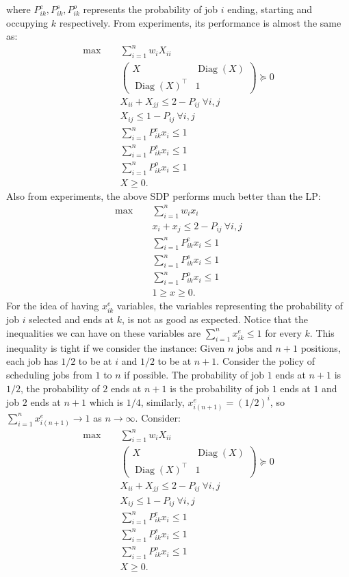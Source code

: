 \documentclass{article}
\newcommand{\Diag}{\operatorname{Diag}}
\begin{document}
where $P_{ik}^e,P_{ik}^s,P_{ik}^o$ represents the probability of job $i$ ending, starting and occupying $k$ respectively.
From experiments, its performance is almost the same as:
\begin{align*}
    \max\quad~&\sum_{i=1}^{n}w_iX_{ii}\\
    &\begin{pmatrix}
        X &\Diag(X)\\
        \Diag(X)^\top &1
    \end{pmatrix}\succeq 0\\
    &X_{ii}+X_{jj}\leq 2-P_{ij}~\forall i,j\\
    &X_{ij}\leq 1-P_{ij}~\forall i,j\\
    & \sum_{i=1}^{n}P_{ik}^e x_i\leq1\\
    & \sum_{i=1}^{n}P_{ik}^s x_i\leq1\\
    & \sum_{i=1}^{n}P_{ik}^o x_i\leq1\\
    &X\geq 0.
\end{align*}
Also from experiments, the above SDP performs much better than the LP:
\begin{align*}
        \max\quad~&\sum_{i=1}^{n}w_ix_{i}\\
    &x_{i}+x_{j}\leq 2-P_{ij}~\forall i,j\\
    & \sum_{i=1}^{n}P_{ik}^e x_i\leq1\\
    & \sum_{i=1}^{n}P_{ik}^s x_i\leq1\\
    & \sum_{i=1}^{n}P_{ik}^o x_i\leq1\\
    &1\geq x\geq 0.
\end{align*}
For the idea of having $x_{ik}^e$ variables, the variables representing the probability of job $i$ selected and ends at $k$, is not as good as expected.
Notice that the inequalities we can have on these variables are $\sum_{i=1}^{n}x_{ik}^e\leq 1$ for every $k$.
This inequality is tight if we consider the instance:
Given $n$ jobs and $n+1$ positions, each job has $1/2$ to be at $i$ and $1/2$ to be at $n+1$.
Consider the policy of scheduling jobs from $1$ to $n$ if possible.
The probability of job $1$ ends at $n+1$ is $1/2$, the probability of $2$ ends at $n+1$ is the probability of job $1$ ends at $1$ and job $2$ ends at $n+1$ which is $1/4$, similarly, $x_{i(n+1)}^e = (1/2)^i$, so
$\sum_{i=1}^{n}x_{i(n+1)}^e\to 1$ as $n\to\infty$.
\newpage
Consider:
\begin{align*}
    \max\quad~&\sum_{i=1}^{n}w_iX_{ii}\\
    &\begin{pmatrix}
        X &\Diag(X)\\
        \Diag(X)^\top &1
    \end{pmatrix}\succeq 0\\
    &X_{ii}+X_{jj}\leq 2-P_{ij}~\forall i,j\\
    &X_{ij}\leq 1-P_{ij}~\forall i,j\\
    & \sum_{i=1}^{n}P_{ik}^e x_i\leq1\\
    & \sum_{i=1}^{n}P_{ik}^s x_i\leq1\\
    & \sum_{i=1}^{n}P_{ik}^o x_i\leq1\\
    &X\geq 0.
\end{align*}
\end{document}
